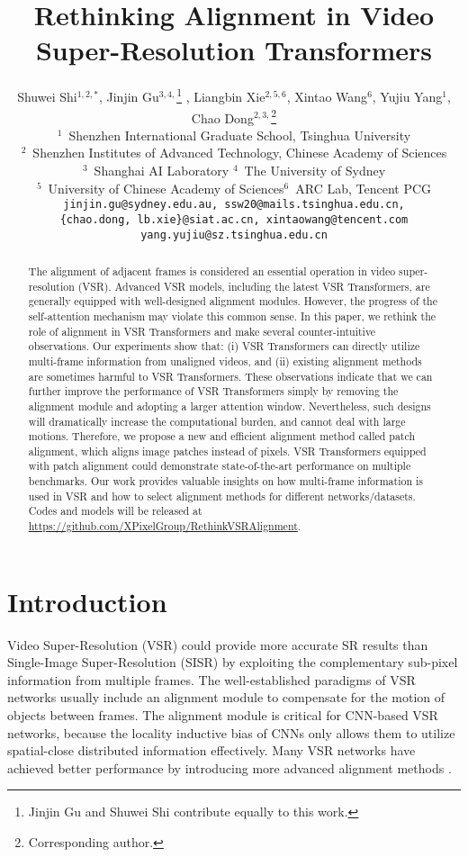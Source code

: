 \documentclass{article}
\title{Rethinking Alignment in Video Super-Resolution Transformers}
\author{Shuwei Shi$^{1,2,*}$, Jinjin Gu$^{3,4,}$\thanks{Jinjin Gu and Shuwei Shi contribute equally to this work.} , Liangbin Xie$^{2,5,6}$, Xintao Wang$^{6}$, Yujiu Yang$^{1}$, Chao Dong$^{2,3,}$\thanks{Corresponding author.}\\
  $^{1}$~Shenzhen International Graduate School, Tsinghua University\\
  $^{2}$~Shenzhen Institutes of Advanced Technology, Chinese Academy of Sciences\\
  $^{3}$~Shanghai AI Laboratory\quad\quad
  $^{4}$~The University of Sydney\\
  $^{5}$~University of Chinese Academy of Sciences\quad\quad $^{6}$~ARC Lab, Tencent PCG\\
  \texttt{jinjin.gu@sydney.edu.au, ssw20@mails.tsinghua.edu.cn,}\\
  \texttt{\{chao.dong, lb.xie\}@siat.ac.cn, xintaowang@tencent.com}\\
  \texttt{yang.yujiu@sz.tsinghua.edu.cn}\\
}
\begin{document}
\maketitle


\begin{abstract}
The alignment of adjacent frames is considered an essential operation in video super-resolution (VSR).
Advanced VSR models, including the latest VSR Transformers, are generally equipped with well-designed alignment modules.
However, the progress of the self-attention mechanism may violate this common sense.
In this paper, we rethink the role of alignment in VSR Transformers and make several counter-intuitive observations.
Our experiments show that:
(i) VSR Transformers can directly utilize multi-frame information from unaligned videos,
and (ii) existing alignment methods are sometimes harmful to VSR Transformers.
These observations indicate that we can further improve the performance of VSR Transformers simply by removing the alignment module and adopting a larger attention window.
Nevertheless, such designs will dramatically increase the computational burden, and cannot deal with large motions.
Therefore, we propose a new and efficient alignment method called patch alignment, which aligns image patches instead of pixels.
VSR Transformers equipped with patch alignment could demonstrate state-of-the-art performance on multiple benchmarks.
Our work provides valuable insights on how multi-frame information is used in VSR and how to select alignment methods for different networks/datasets.
Codes and models will be released at \url{https://github.com/XPixelGroup/RethinkVSRAlignment}.
\end{abstract}


\section{Introduction}
\label{sec:intro}
\vspace{-2mm}
Video Super-Resolution (VSR) could provide more accurate SR results than Single-Image Super-Resolution (SISR) by exploiting the complementary sub-pixel information from multiple frames. 
The well-established paradigms of VSR networks usually include an alignment module to compensate for the motion of objects between frames.
The alignment module is critical for CNN-based VSR networks, because the locality inductive bias of CNNs only allows them to utilize spatial-close distributed information effectively.
Many VSR networks have achieved better performance by introducing more advanced alignment methods \cite{wang2019edvr,chan2021basicvsr,tian2020tdan,liang2022recurrent}.
\end{document}
